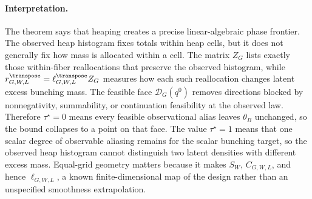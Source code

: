 \paragraph{Interpretation.}
The theorem says that heaping creates a precise linear-algebraic phase frontier.  The observed heap histogram fixes totals within heap cells, but it does not generally fix how mass is allocated within a cell.  The matrix \(Z_G\) lists exactly those within-fiber reallocations that preserve the observed histogram, while \(r_{G,W,L}^{\transpose}=\ell_{G,W,L}^{\transpose}Z_G\) measures how each such reallocation changes latent excess bunching mass.  The feasible face \(\mathcal{D}_G(q^0)\) removes directions blocked by nonnegativity, summability, or continuation feasibility at the observed law.  Therefore \(\tau^\star=0\) means every feasible observational alias leaves \(\theta_B\) unchanged, so the bound collapses to a point on that face.  The value \(\tau^\star=1\) means that one scalar degree of observable aliasing remains for the scalar bunching target, so the observed heap histogram cannot distinguish two latent densities with different excess mass.  Equal-grid geometry matters because it makes \(S_W\), \(C_{G,W,L}\), and hence \(\ell_{G,W,L}\), a known finite-dimensional map of the design rather than an unspecified smoothness extrapolation.

